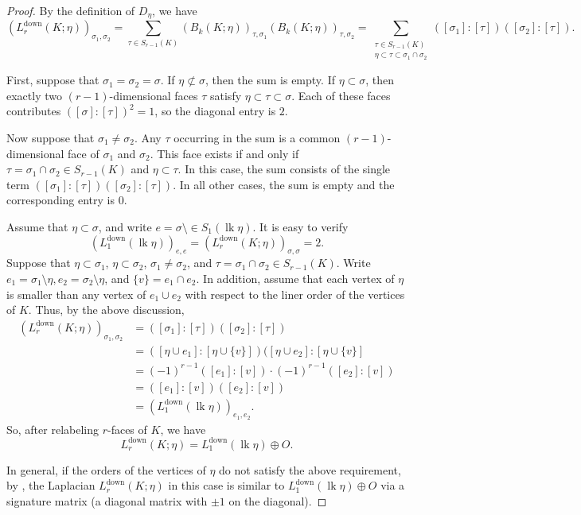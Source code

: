 \documentclass[12pt]{amsart}
\theoremstyle{plain}
\theoremstyle{definition}
\numberwithin{equation}{section}
\numberwithin{figure}{section}
\newcommand{\Ldown}{L^{\operatorname{down}}}
\newcommand{\lk}{\operatorname{lk}}
\begin{document}
\begin{proof}
By the definition of $D_\eta$, we have
\[
(\Ldown_r(K;\eta))_{\sigma_1,\sigma_2}
= \sum_{\tau \in S_{r - 1}(K)}
(B_k(K;\eta))_{\tau,\sigma_1}(B_k(K;\eta))_{\tau,\sigma_2}
= \sum_{\substack{\tau \in S_{r - 1}(K)\\
\eta \subset \tau \subset \sigma_1 \cap \sigma_2}}
([\sigma_1] : [\tau])([\sigma_2] : [\tau]).
\]


First, suppose that  $\sigma_1 = \sigma_2 = \sigma$.
If $\eta \not\subset \sigma$, then the sum is empty.
If $\eta \subset \sigma$, then exactly two $(r - 1)$-dimensional faces $\tau$ satisfy $\eta \subset \tau \subset \sigma$.
Each of these faces contributes $([\sigma] : [\tau])^2 = 1$, so the diagonal entry is $2$.

Now suppose that $\sigma_1 \ne \sigma_2$.
Any $\tau$ occurring in the sum is a common $(r - 1)$-dimensional face of $\sigma_1$ and $\sigma_2$.
 This face exists if and only if $\tau = \sigma_1 \cap \sigma_2 \in S_{r - 1}(K)$ and $\eta \subset \tau$.
In this case, the sum consists of the single term $([\sigma_1] : [\tau])([\sigma_2] : [\tau])$.
In all other cases, the sum is empty and the corresponding entry is $0$.

Assume that $\eta \subset \sigma$, and write $e=\sigma \setminus \in S_1(\lk \eta)$.
It is easy to verify
$$ (\Ldown_1(\lk \eta))_{e,e}=(\Ldown_r(K;\eta))_{\sigma, \sigma}=2.$$
Suppose that $\eta  \subset \sigma_1$, $\eta \subset \sigma_2$, $\sigma_1 \ne \sigma_2$, and $\tau=\sigma_1 \cap \sigma_2 \in S_{r-1}(K)$.
Write $e_1=\sigma_1 \setminus \eta, e_2 =\sigma_2 \setminus \eta$, and $\{v\}=e_1 \cap e_2$.
In addition, assume that each vertex of $\eta$ is smaller than any vertex of $e_1 \cup e_2$ with respect to the liner order of the vertices of $K$. 
Thus, by the above discussion, 
\[
\begin{split}
(\Ldown_r(K;\eta))_{\sigma_1,\sigma_2} & =
([\sigma_1] : [\tau])([\sigma_2] : [\tau])\\ 
&=([\eta \cup e_1]: [\eta \cup \{v\}])([\eta \cup e_2]: [\eta \cup \{v\}]\\
&= (-1)^{r-1} ([e_1]: [v]) \cdot (-1)^{r-1}([e_2]: [v])\\
& = ([e_1]: [v]) ([e_2]: [v])\\
&= (\Ldown_1(\lk \eta))_{e_1,e_2}.
\end{split}
\]
So, after relabeling $r$-faces of $K$, we have 
$$ \Ldown_r(K;\eta)= \Ldown_1(\lk \eta) \oplus O.$$

In general, if the orders of the vertices of $\eta$ do not satisfy the above requirement, by \cite[Lemma 3.2]{FSZ2025}, the Laplacian $\Ldown_r(K;\eta)$ in this case is similar to $\Ldown_1(\lk \eta) \oplus O$ via a signature matrix (a diagonal matrix with $\pm 1$ on the diagonal).
\end{proof}
\end{document}
